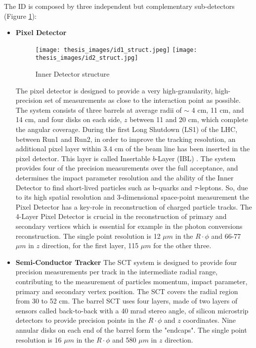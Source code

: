 \documentclass[a4paper, oneside, 11pt, openright]{book}
\begin{document}
				The ID is composed by three independent but complementary sub-detectors \cite{ID_report} (Figure \ref{fig:ID_struct}):
				\begin{itemize}
					\item \textbf{Pixel Detector}
						\begin{figure}
							\centering
							\texttt{[image: thesis\_images/id1\_struct.jpeg]}
							\texttt{[image: thesis\_images/id2\_struct.jpg]}
							\caption{Inner Detector structure}
							\label{fig:ID_struct}
						\end{figure}
						The pixel detector \cite{ID_inner_report} is designed to provide a very high-granularity, high-precision set of measurements as close to the interaction point as possible. The system consists of three barrels at average radii of $\sim$ 4 cm, 11 cm, and 14 cm, and four disks on each side, $z$ between 11 and 20 cm, which complete the angular coverage. During the first Long Shutdown (LS1) of the LHC, between Run1 and Run2, in order to improve the tracking resolution, an additional pixel layer within 3.4 cm of the beam line has been inserted in the pixel detector. This layer is called Insertable $b$-Layer (IBL) \cite{IBL_report}. The system provides four of the precision measurements over the full acceptance, and determines the impact parameter resolution and the ability of the Inner Detector to find short-lived particles such as b-quarks and $\tau$-leptons. So, due to its high spatial resolution and 3-dimensional space-point measurement the Pixel Detector has a key-role in reconstruction of charged particle tracks. The 4-Layer Pixel Detector is crucial in the reconstruction of primary and secondary vertices which is essential for example in the photon conversions reconstruction. The single point resolution is 12 $\mu m$ in the $R\cdot\phi$ and 66-77 $\mu m$ in $z$ direction, for the first layer, 115 $\mu m$ for the other three.
					\item \textbf{Semi-Conductor Tracker}
						The SCT system is designed to provide four precision measurements per track in the intermediate radial range, contributing to the measurement of particles momentum, impact parameter, primary and secondary vertex position. The SCT covers the radial region from 30 to 52 cm. The barrel SCT uses four layers, made of two layers of sensors called back-to-back with a 40 mrad stereo angle, of silicon microstrip detectors to provide precision points in the $R\cdot\phi$ and $z$ coordinates. Nine annular disks on each end of the barrel form the "endcaps". The single point resolution is 16 $\mu m$ in the $R\cdot\phi$ and 580 $\mu m$ in $z$ direction.

\end{itemize}
\end{document}
